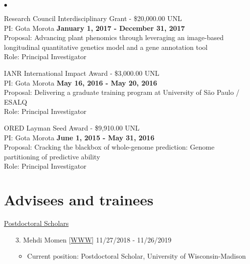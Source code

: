 \documentclass[margin,line,10pt]{res}
\newenvironment{list2}{
  \begin{list}{$\bullet$}{%
      \setlength{\itemsep}{0in}
      \setlength{\parsep}{0in} \setlength{\parskip}{0in}
      \setlength{\topsep}{0in} \setlength{\partopsep}{0in} 
      \setlength{\leftmargin}{0.2in}}}{\end{list}}
\begin{document}
\begin{resume}
\begin{list2}
\vspace{0.5cm}

\item Research Council Interdisciplinary Grant  - \$20,000.00  \hfill UNL\\
PI: Gota Morota   \hfill \textbf{January 1, 2017 - December 31, 2017}\\
Proposal: Advancing plant phenomics through leveraging an image-based longitudinal quantitative genetics model and a gene annotation tool  \\
Role: Principal Investigator \\

\vspace{0.5cm}


\item IANR International Impact Award - \$3,000.00  \hfill UNL\\
PI: Gota Morota   \hfill \textbf{May 16, 2016 - May 20, 2016}\\
Proposal: Delivering a graduate training program at University of S{\~a}o Paulo / ESALQ  \\
Role: Principal Investigator \\ 

\vspace{0.5cm}

\item ORED Layman Seed Award - \$9,910.00  \hfill UNL\\
PI: Gota Morota   \hfill \textbf{June 1, 2015 - May 31, 2016}\\
Proposal: Cracking the blackbox of whole-genome prediction: Genome partitioning of predictive ability \\
Role: Principal Investigator \\


\end{list2}



\vspace{0.5cm}
\section{\sc Advisees and trainees}

\begin{flushleft}
\hspace{0.2cm} \underline{Postdoctoral Scholars}
\end{flushleft}
\begin{enumerate}
  
\item [3.] Mehdi Momen [\textcolor{blue}{\href{https://mehdimomen.github.io/}{WWW}}]  \hfill 11/27/2018 - 11/26/2019
  \begin{itemize} 
  \item Current position: Postdoctoral Scholar, University of Wisconsin-Madison 
  \end{itemize}
  

\end{enumerate}
\end{resume}
\end{document}
